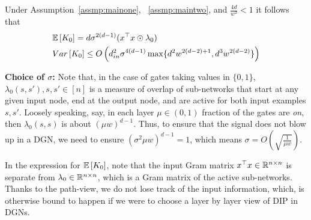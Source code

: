 \begin{theorem}\label{th:dgnexp}
Under Assumption~\ref{assmp:mainone}, ~\ref{assmp:maintwo}, and $\frac{4d}{w^2}<1$ it follows that
 \begin{align*}
&\mathbb{E}\left[K_0\right]=d\sigma^{2(d-1)}(x^\top x \odot \lambda_0)\\
&Var\left[K_0\right]\leq O\left(d^2_{in}\sigma^{4(d-1)}\max\{d^2w^{2(d-2)+1}, d^3w^{2(d-2)}\}\right)
\end{align*}
\end{theorem}

\textbf{Choice of $\sigma$:} Note that, in the case of gates taking values in $\{0,1\}$, $\lambda_0(s,s'), s,s'\in [n]$ is a measure of overlap of sub-networks that start at any given input node, end at the output node, and are active for both input examples $s,s'$.
Loosely speaking, say, in each layer $\mu\in(0,1)$ fraction of the gates are \emph{on}, then $\lambda_0(s,s)$ is about $(\mu w)^{d-1}$. Thus, to ensure that the signal does not blow up in a DGN, we need to ensure $(\sigma^2 \mu w)^{d-1}=1$, which means $\sigma=O\left(\sqrt{\frac1{\mu w}}\right)$. %

In the expression for $\mathbb{E}\left[K_0\right]$, note that the input Gram matrix $x^\top x \in \mathbb{R}^{n\times n}$ is separate from $\lambda_0\in \mathbb{R}^{n\times n}$,	 which is a Gram matrix of the active sub-networks. Thanks to the path-view, we do not lose track of the input information, which, is otherwise bound to happen if we were to choose a layer by layer view of DIP in DGNs.

